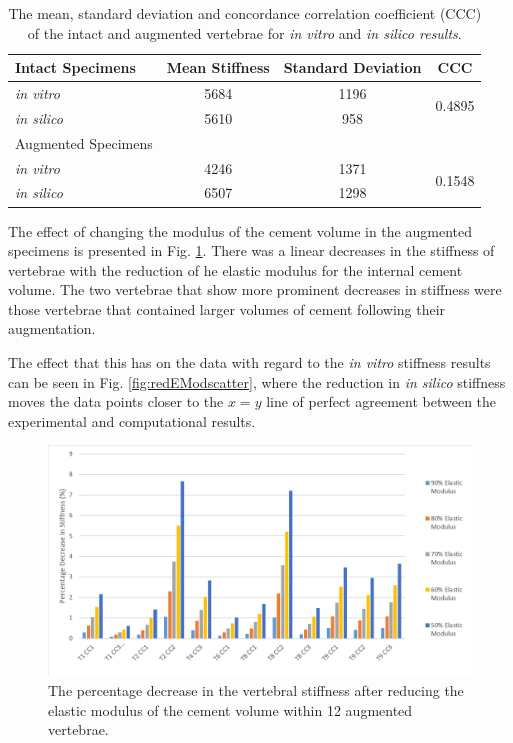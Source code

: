 \begin{table}[ht]
\centering
\caption{The mean, standard deviation and concordance correlation coefficient (CCC) of the intact and augmented vertebrae for \textit{in vitro} and \textit{in silico results}.}
\label{tab:int}
\begin{tabular}{l|c|c|c}
     Intact Specimens     & Mean Stiffness & Standard Deviation & CCC                     \\ \hline \hline
\textit{in vitro}  & 5684 & 1196             & \multirow{2}{*}{0.4895} \\
\textit{in silico} & 5610 & 958               &                        \\
\hline
 Augmented Specimens
 \\ \hline \hline
\textit{in vitro}  & 4246 & 1371               & \multirow{2}{*}{0.1548} \\
\textit{in silico} & 6507 & 1298               &                      \\ \hline
\end{tabular}
\end{table}

The effect of changing the modulus of the cement volume in the augmented specimens is presented in Fig. \ref{fig:redEModBar}. There was a linear decreases in the stiffness of vertebrae with the reduction of he elastic modulus for the internal cement volume. The two vertebrae that show more prominent decreases in stiffness were those vertebrae that contained larger volumes of cement following their augmentation.

The effect that this has on the data with regard to the \textit{in vitro} stiffness results can be seen in Fig. \ref{fig:redEModscatter}, where the reduction in \textit{in silico} stiffness moves the data points closer to the $x = y$ line of perfect agreement between the experimental and computational results.


\begin{figure}[ht!]
\centering
\includegraphics[width=\textwidth]{images/reductionOfEMod_Bar.png}
\caption{The percentage decrease in the vertebral stiffness after reducing the elastic modulus of the cement volume within 12 augmented vertebrae.}
\label{fig:redEModBar}
\end{figure}

